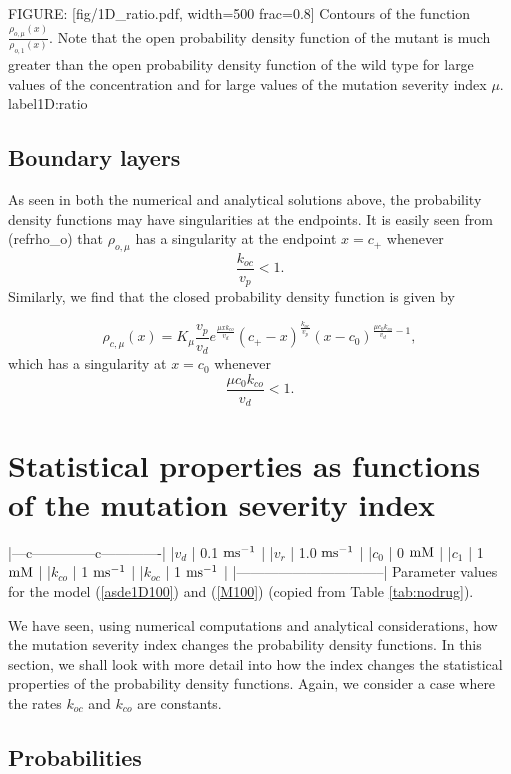 FIGURE: [fig/1D_ratio.pdf, width=500 frac=0.8] Contours of the function $\frac{\rho_{o,\mu}(x)}{\rho_{o,1}(x)}$. Note that the open probability density function
of the mutant is much greater than the open probability density function
of the wild type for large values of the concentration and for large values of the mutation severity index $\mu$. label{1D:ratio}\subsection{Boundary layers}

As seen in both the numerical and analytical solutions above, the probability
density functions may have singularities at the endpoints. It is easily seen
from (ref{rho_o}) that $\rho_{o,\mu}$ has a singularity at
the endpoint $x=c_{+}$ whenever
\[
\frac{k_{oc}}{v_{p}}<1.
\]
Similarly, we find that the closed probability density function is given by



\[
\rho_{c,\mu}(x)=K_{\mu}\frac{v_{p}}{v_{d}}e^{\frac{\mu xk_{co}}{v_{d}}}
(c_{+}-x)^{\frac{k_{oc}}{v_{p}}}(x-c_{0})^{\frac{\mu c_{0}k_{co}}{v_{d}}-1},
\]
which has a singularity at $x=c_{0}$ whenever
\[
\frac{\mu c_{0}k_{co}}{v_{d}}<1.
\]


\bigskip

\section[Statistical properties of the mutation]{Statistical properties as functions of the mutation severity index}

|---c--------------c-------------|
|$v_d $    | 0.1 $\rm{ms^{-1}}$  |
|$v_r $    | 1.0 $\rm{ms^{-1}}$  |
|$c_0 $    | 0 $\rm{mM}$         |
|$c_1 $    | 1 $\rm{mM}$         |
|$k_{co} $ | 1 $\rm{ms^{-1}}$    |
|$k_{oc} $ | 1 $\rm{ms^{-1}}$    |
|--------------------------------|
Parameter values for the model (\ref{asde1D100}) and (\ref{M100}) (copied from Table \ref{tab:nodrug}). \label{tab:nodrug_again}

We have seen, using numerical computations and analytical considerations, how
the mutation severity index changes the probability density functions. In this
section, we shall look with more detail into how the index changes the
statistical properties of the probability density functions. Again, we consider a case where
the rates $k_{oc}$ and  $k_{co}$ are constants.



\subsection{Probabilities}

